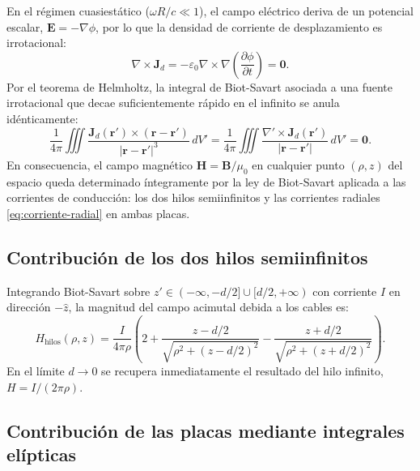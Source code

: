 \documentclass[11pt]{article}
\begin{document}
En el régimen cuasiestático ($\omega R / c \ll 1$), el campo eléctrico deriva de un potencial escalar, $\mathbf{E} = -\nabla \phi$, por lo que la densidad de corriente de desplazamiento es irrotacional:
\begin{equation}
    \nabla \times \mathbf{J}_d = -\varepsilon_0 \nabla \times \nabla \left( \frac{\partial \phi}{\partial t} \right) = \mathbf{0}.
\end{equation}
Por el teorema de Helmholtz, la integral de Biot-Savart asociada a una fuente irrotacional que decae suficientemente rápido en el infinito se anula idénticamente:
\begin{equation}
    \frac{1}{4\pi} \iiint \frac{\mathbf{J}_d(\mathbf{r}') \times (\mathbf{r} - \mathbf{r}')}{|\mathbf{r} - \mathbf{r}'|^3}\,dV' = \frac{1}{4\pi} \iiint \frac{\nabla' \times \mathbf{J}_d(\mathbf{r}')}{|\mathbf{r} - \mathbf{r}'|}\,dV' = \mathbf{0}.
\end{equation}
En consecuencia, el campo magnético $\mathbf{H} = \mathbf{B}/\mu_0$ en cualquier punto $(\rho, z)$ del espacio queda determinado íntegramente por la ley de Biot-Savart aplicada a las corrientes de conducción: los dos hilos semiinfinitos y las corrientes radiales \eqref{eq:corriente-radial} en ambas placas.

\subsection{Contribución de los dos hilos semiinfinitos}

Integrando Biot-Savart sobre $z' \in (-\infty, -d/2] \cup [d/2, +\infty)$ con corriente $I$ en dirección $-\hat{z}$, la magnitud del campo acimutal debida a los cables es:
\begin{equation}
    H_{\mathrm{hilos}}(\rho, z) = \frac{I}{4\pi \rho} \left( 2 + \frac{z - d/2}{\sqrt{\rho^2 + (z - d/2)^2}} - \frac{z + d/2}{\sqrt{\rho^2 + (z + d/2)^2}} \right).
    \label{eq:H-hilos}
\end{equation}
En el límite $d \to 0$ se recupera inmediatamente el resultado del hilo infinito, $H = I / (2\pi\rho)$.

\subsection{Contribución de las placas mediante integrales elípticas}
\end{document}
